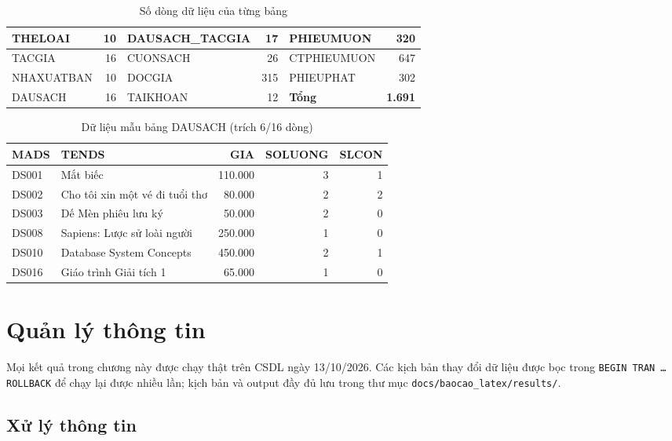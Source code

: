 \documentclass[a4paper,oneside]{report}
\begin{document}
\begin{table}[!htbp]
\centering\small
\caption{Số dòng dữ liệu của từng bảng}
\label{tab:sodong}
\begin{tabular}{|l|r||l|r||l|r|}
\hline
THELOAI & 10 & DAUSACH\_TACGIA & 17 & PHIEUMUON & 320\\\hline
TACGIA & 16 & CUONSACH & 26 & CTPHIEUMUON & 647\\\hline
NHAXUATBAN & 10 & DOCGIA & 315 & PHIEUPHAT & 302\\\hline
DAUSACH & 16 & TAIKHOAN & 12 & \textbf{Tổng} & \textbf{1.691}\\\hline
\end{tabular}
\end{table}

\begin{table}[!htbp]
\centering\small
\caption{Dữ liệu mẫu bảng DAUSACH (trích 6/16 dòng)}
\label{tab:mau}
\begin{tabular}{|l|l|r|r|r|}
\hline
\textbf{MADS} & \textbf{TENDS} & \textbf{GIA} & \textbf{SOLUONG} & \textbf{SLCON}\\\hline
DS001 & Mắt biếc & 110.000 & 3 & 1\\\hline
DS002 & Cho tôi xin một vé đi tuổi thơ & 80.000 & 2 & 2\\\hline
DS003 & Dế Mèn phiêu lưu ký & 50.000 & 2 & 0\\\hline
DS008 & Sapiens: Lược sử loài người & 250.000 & 1 & 0\\\hline
DS010 & Database System Concepts & 450.000 & 2 & 1\\\hline
DS016 & Giáo trình Giải tích 1 & 65.000 & 1 & 0\\\hline
\end{tabular}
\end{table}

\chapter{Quản lý thông tin}
Mọi kết quả trong chương này được chạy thật trên CSDL ngày 13/10/2026. Các kịch bản thay đổi dữ liệu được bọc trong \texttt{BEGIN TRAN … ROLLBACK} để chạy lại được nhiều lần; kịch bản và output đầy đủ lưu trong thư mục \texttt{docs/baocao\_latex/results/}.

\section{Xử lý thông tin}
\end{document}
